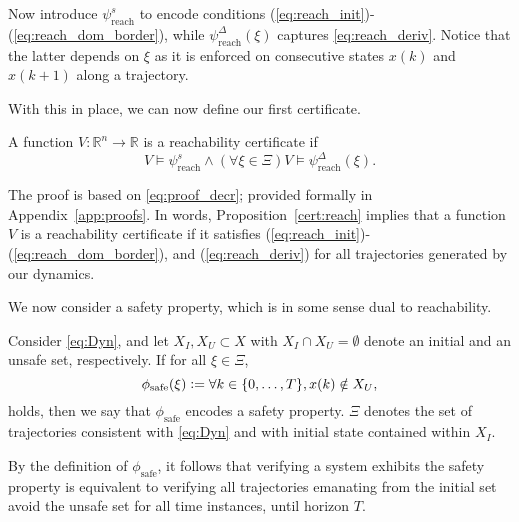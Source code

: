 Now introduce  $\psi^s_{\mathrm{reach}}$ to encode conditions (\ref{eq:reach_init})-(\ref{eq:reach_dom_border}), while
$\psi^\Delta_{\mathrm{reach}}(\xi)$ captures \eqref{eq:reach_deriv}. Notice that the latter depends on $\xi$ as it is enforced on consecutive states $x(k)$ and $x(k+1)$ along a trajectory.

With this in place, we can now define our first certificate.

\begin{prop}
\label{cert:reach}
    A function $V \colon \mathbb{R}^n \rightarrow \mathbb{R}$ is a reachability certificate if
	 \begin{equation}
	     V \models \psi^s_{\mathrm{reach}} \wedge (\forall \xi \in \Xi) V\models\psi^\Delta_{\mathrm{reach}}(\xi).
	 \end{equation}
\end{prop}
The proof is based on \eqref{eq:proof_decr}; provided formally in Appendix~\ref{app:proofs}.
In words, Proposition~\ref{cert:reach} implies that a function $V$ is a reachability certificate if it satisfies (\ref{eq:reach_init})-(\ref{eq:reach_dom_border}), and (\ref{eq:reach_deriv}) for all trajectories generated by our dynamics.

We now consider a safety property, which is in some sense dual to reachability.

\begin{property}[Safety]\label{prop:safe}
   Consider \eqref{eq:Dyn}, and let $X_I, X_U \subset X$ with $X_I \cap X_U = \emptyset$ denote an initial and an unsafe set, respectively. If for all $\xi \in \Xi$,
    $$
        \phi_\mathrm{safe}(\xi) \vcentcolon= \forall k \in \{0,\dots,T\}, x(k) \notin X_U,
    $$
    holds, then we say that $\phi_\mathrm{safe}$ encodes a safety property. $\Xi$ denotes the set of trajectories consistent with \eqref{eq:Dyn} and with initial state contained within $X_I$.
\end{property}
By the definition of $\phi_\mathrm{safe}$, it follows that verifying a system exhibits the safety property is equivalent to verifying all trajectories emanating from the initial set avoid the unsafe set for all time instances, until horizon $T$.

